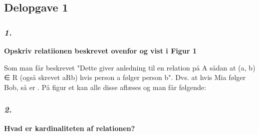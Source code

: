 \documentclass{article}
\begin{document}
\begin{Maple Normal}{
}\end{Maple Normal}
\begin{Maple Normal}{
}\end{Maple Normal}
\begin{Maple Normal}{
}\end{Maple Normal}
\subsection{\textbf{Delopgave 1}}
\subsubsection{\textbf{\textit{1. }}}
\begin{Maple Normal}{
\textbf{Opskriv relatiionen beskrevet ovenfor og vist i Figur 1}}\end{Maple Normal}

\begin{Maple Normal}{
}\end{Maple Normal}
\begin{Maple Normal}{
Som man får beskrevet "Dette giver anledning til en relation på A sådan at (a, b) ∈ R (også skrevet aRb) hvis person a følger person b". Dvs. at hvis Mia følger Bob, så er 
. På figur et kan alle disse aflæses og man får følgende:}\end{Maple Normal}

\begin{Maple Normal}{
}\end{Maple Normal}
\begin{Maple Normal}{
}\end{Maple Normal}
\subsubsection{\textbf{\textit{2. }}}
\begin{Maple Normal}{
\textbf{Hvad er kardinaliteten af relationen?}}\end{Maple Normal}
\end{document}
